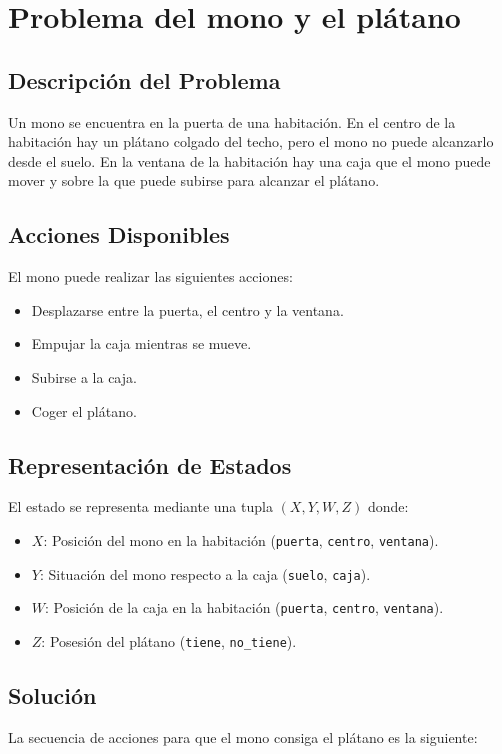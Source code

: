 \section{Problema del mono y el plátano}

\subsection*{Descripción del Problema}
Un mono se encuentra en la puerta de una habitación. En el centro de la habitación hay un plátano colgado del techo, pero el mono no puede alcanzarlo desde el suelo. En la ventana de la habitación hay una caja que el mono puede mover y sobre la que puede subirse para alcanzar el plátano.

\subsection*{Acciones Disponibles}
El mono puede realizar las siguientes acciones:
\begin{itemize}
    \item Desplazarse entre la puerta, el centro y la ventana.
    \item Empujar la caja mientras se mueve.
    \item Subirse a la caja.
    \item Coger el plátano.
\end{itemize}

\subsection*{Representación de Estados}
El estado se representa mediante una tupla $(X, Y, W, Z)$ donde:
\begin{itemize}
    \item $X$: Posición del mono en la habitación (\texttt{puerta}, \texttt{centro}, \texttt{ventana}).
    \item $Y$: Situación del mono respecto a la caja (\texttt{suelo}, \texttt{caja}).
    \item $W$: Posición de la caja en la habitación (\texttt{puerta}, \texttt{centro}, \texttt{ventana}).
    \item $Z$: Posesión del plátano (\texttt{tiene}, \texttt{no\_tiene}).
\end{itemize}
\newpage
\subsection*{Solución}
La secuencia de acciones para que el mono consiga el plátano es la siguiente:

